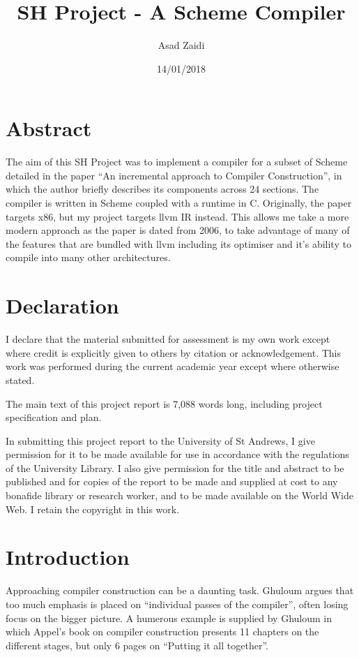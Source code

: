 \documentclass{article}
\title{SH Project - A Scheme Compiler}
\date{14/01/2018}
\author{Asad Zaidi}
\affil{University of St Andrews}
\begin{document}
\maketitle

\section{Abstract}

The aim of this SH Project was to implement a compiler for a subset of Scheme detailed in the paper ``An incremental approach to Compiler Construction'', in which the author briefly describes its components across 24 sections. The compiler is written in Scheme coupled with a runtime in C. Originally, the paper targets x86, but my project targets llvm IR instead. This allows me take a more modern approach as the paper is dated from 2006, to take advantage of many of the features that are bundled with llvm including its optimiser and it's ability to compile into many other architectures.

\section{Declaration}

I declare that the material submitted for assessment is my own work except where credit is explicitly given to others by citation or acknowledgement. This work was performed during the current academic year except where otherwise stated.

The main text of this project report is 7,088 words long, including project specification and plan.

In submitting this project report to the University of St Andrews, I give permission for it to be made available for use in accordance with the regulations of the University Library. I also give permission for the title and abstract to be published and for copies of the report to be made and supplied at cost to any bonafide library or research worker, and to be made available on the World Wide Web. I retain the copyright in this work.

\section{Introduction}

Approaching compiler construction can be a daunting task. Ghuloum argues that too much emphasis is placed on ``individual passes of the compiler'', often losing focus on the bigger picture. A humerous example is supplied by Ghuloum in which Appel's book on compiler construction presents 11 chapters on the different stages, but only 6 pages on ``Putting it all together''.
\end{document}
